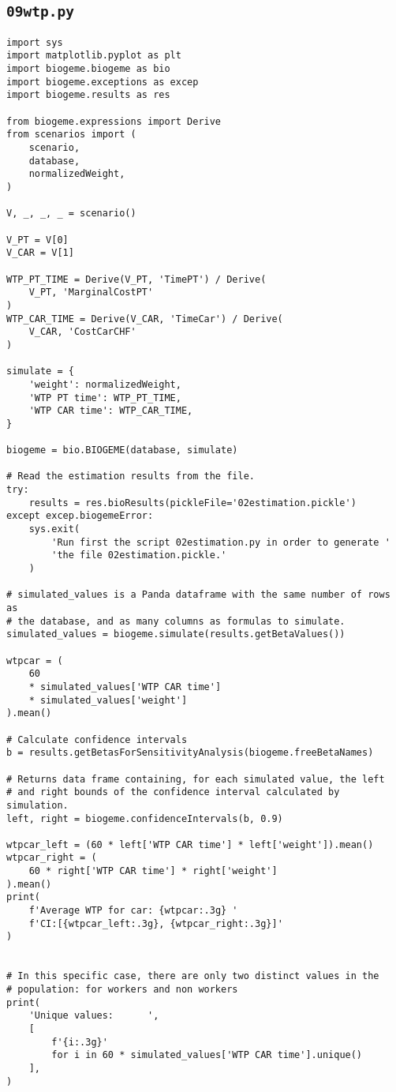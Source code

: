 \documentclass[12pt,a4paper]{article}
\begin{document}
\subsection{\lstinline$09wtp.py$}\label{sec:09wtp}
\begin{lstlisting}[style=numbers]
import sys
import matplotlib.pyplot as plt
import biogeme.biogeme as bio
import biogeme.exceptions as excep
import biogeme.results as res

from biogeme.expressions import Derive
from scenarios import (
    scenario,
    database,
    normalizedWeight,
)

V, _, _, _ = scenario()

V_PT = V[0]
V_CAR = V[1]

WTP_PT_TIME = Derive(V_PT, 'TimePT') / Derive(
    V_PT, 'MarginalCostPT'
)
WTP_CAR_TIME = Derive(V_CAR, 'TimeCar') / Derive(
    V_CAR, 'CostCarCHF'
)

simulate = {
    'weight': normalizedWeight,
    'WTP PT time': WTP_PT_TIME,
    'WTP CAR time': WTP_CAR_TIME,
}

biogeme = bio.BIOGEME(database, simulate)

# Read the estimation results from the file.
try:
    results = res.bioResults(pickleFile='02estimation.pickle')
except excep.biogemeError:
    sys.exit(
        'Run first the script 02estimation.py in order to generate '
        'the file 02estimation.pickle.'
    )

# simulated_values is a Panda dataframe with the same number of rows as
# the database, and as many columns as formulas to simulate.
simulated_values = biogeme.simulate(results.getBetaValues())

wtpcar = (
    60
    * simulated_values['WTP CAR time']
    * simulated_values['weight']
).mean()

# Calculate confidence intervals
b = results.getBetasForSensitivityAnalysis(biogeme.freeBetaNames)

# Returns data frame containing, for each simulated value, the left
# and right bounds of the confidence interval calculated by simulation.
left, right = biogeme.confidenceIntervals(b, 0.9)

wtpcar_left = (60 * left['WTP CAR time'] * left['weight']).mean()
wtpcar_right = (
    60 * right['WTP CAR time'] * right['weight']
).mean()
print(
    f'Average WTP for car: {wtpcar:.3g} '
    f'CI:[{wtpcar_left:.3g}, {wtpcar_right:.3g}]'
)


# In this specific case, there are only two distinct values in the
# population: for workers and non workers
print(
    'Unique values:      ',
    [
        f'{i:.3g}'
        for i in 60 * simulated_values['WTP CAR time'].unique()
    ],
)



\end{lstlisting}
\end{document}
